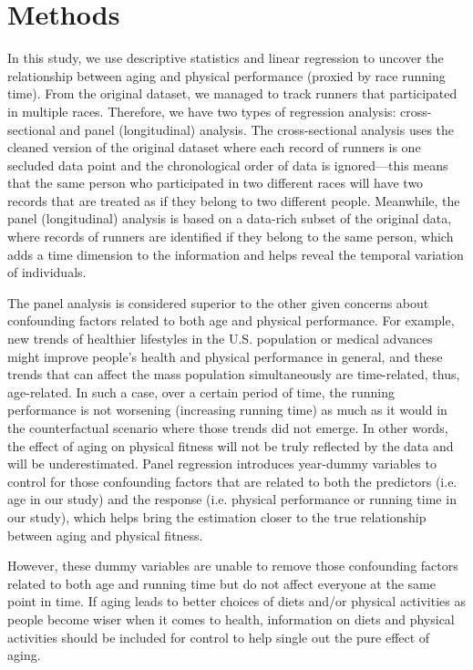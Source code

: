 \documentclass[12pt]{article}
\begin{document}
\section*{Methods}

In this study, we use descriptive statistics and linear regression to uncover
the relationship between aging and physical performance (proxied by race
running time).
From the original dataset, we managed to track runners that participated in
multiple races.
Therefore, we have two types of regression analysis: cross-sectional and panel
(longitudinal) analysis.
The cross-sectional analysis uses the cleaned version of the original dataset
where each record of runners is one secluded data point and the chronological
order of data is ignored---this means that the same person who participated
in two different races will have two records that are treated as if they
belong to two different people. Meanwhile, the panel (longitudinal) analysis
is based on a data-rich subset of the original data, where records of runners
are identified if they belong to the same person, which adds a time
dimension to the information and helps reveal the temporal variation
of individuals.

The panel analysis is considered superior to the other given concerns about
confounding factors related to both age and physical performance.
For example, new trends of healthier lifestyles in the U.S. population or
medical advances might improve people's health and physical performance in
general, and these trends that can affect the mass population simultaneously
are time-related, thus, age-related.
In such a case, over a certain period of time, the running performance is
not worsening (increasing running time) as much as it would in the
counterfactual scenario where those trends did not emerge.
In other words, the effect of aging on physical fitness will not be truly
reflected by the data and will be underestimated.
Panel regression introduces year-dummy variables to control for those
confounding factors that are related to both the predictors
(i.e. age in our study) and the response (i.e. physical performance or
running time in our study), which helps bring the estimation closer to
the true relationship between aging and physical fitness.


However, these dummy variables are unable to remove those confounding
factors related to both age and running time but do not affect everyone
at the same point in time.
If aging leads to better choices of diets and/or physical activities as
people become wiser when it comes to health, information on diets and
physical activities should be included for control to help single out the
pure effect of aging.
\end{document}
